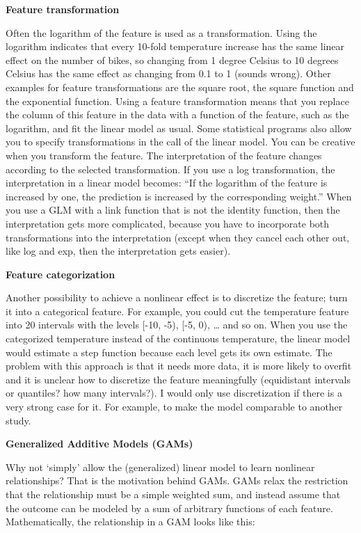 \documentclass[
  12pt,
]{krantz}
\begin{document}
\textbf{Feature transformation}

Often the logarithm of the feature is used as a transformation.
Using the logarithm indicates that every 10-fold temperature increase has the same linear effect on the number of bikes, so changing from 1 degree Celsius to 10 degrees Celsius has the same effect as changing from 0.1 to 1 (sounds wrong).
Other examples for feature transformations are the square root, the square function and the exponential function.
Using a feature transformation means that you replace the column of this feature in the data with a function of the feature, such as the logarithm, and fit the linear model as usual.
Some statistical programs also allow you to specify transformations in the call of the linear model.
You can be creative when you transform the feature.
The interpretation of the feature changes according to the selected transformation.
If you use a log transformation, the interpretation in a linear model becomes:
``If the logarithm of the feature is increased by one, the prediction is increased by the corresponding weight.''
When you use a GLM with a link function that is not the identity function, then the interpretation gets more complicated, because you have to incorporate both transformations into the interpretation (except when they cancel each other out, like log and exp, then the interpretation gets easier).

\textbf{Feature categorization}

Another possibility to achieve a nonlinear effect is to discretize the feature; turn it into a categorical feature.
For example, you could cut the temperature feature into 20 intervals with the levels {[}-10, -5), {[}-5, 0), \ldots{} and so on.
When you use the categorized temperature instead of the continuous temperature, the linear model would estimate a step function because each level gets its own estimate.
The problem with this approach is that it needs more data, it is more likely to overfit and it is unclear how to discretize the feature meaningfully (equidistant intervals or quantiles? how many intervals?).
I would only use discretization if there is a very strong case for it.
For example, to make the model comparable to another study.

\textbf{Generalized Additive Models (GAMs)}

Why not `simply' allow the (generalized) linear model to learn nonlinear relationships?
That is the motivation behind GAMs.
GAMs relax the restriction that the relationship must be a simple weighted sum, and instead assume that the outcome can be modeled by a sum of arbitrary functions of each feature.
Mathematically, the relationship in a GAM looks like this:
\end{document}
